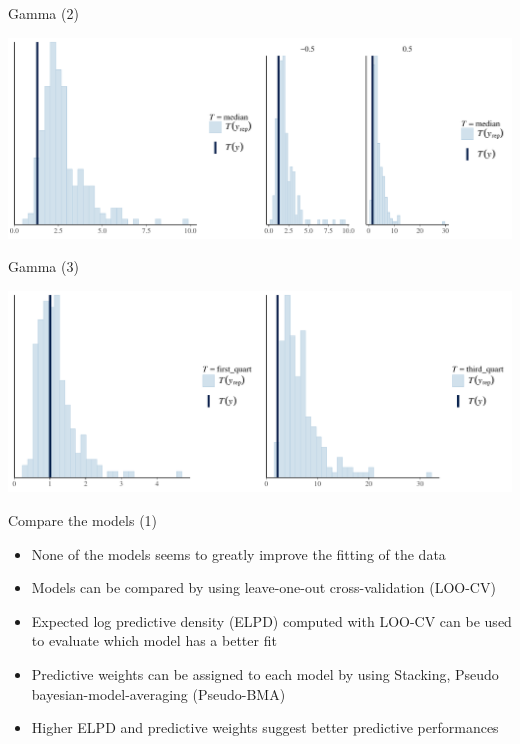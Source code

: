 \documentclass[ignorenonframetext,a4paper]{beamer}
\begin{document}
\begin{frame}{Gamma (2)}

\includegraphics{DB_presentation_case_study_files/figure-beamer/unnamed-chunk-19-1.pdf}

\end{frame}

\begin{frame}{Gamma (3)}

\includegraphics{DB_presentation_case_study_files/figure-beamer/unnamed-chunk-20-1.pdf}

\end{frame}

\begin{frame}{Compare the models (1)}

\begin{itemize}
\setlength\itemsep{1em}
  \item{None of the models seems to greatly improve the fitting of the
        data}
  \item{Models can be compared by using leave-one-out cross-validation
        (LOO-CV)}
  \item{Expected log predictive density (ELPD) computed with LOO-CV
        can be used to evaluate which model has a better fit}
  \item{Predictive weights can be assigned to each model by using
        Stacking, Pseudo bayesian-model-averaging (Pseudo-BMA)}
  \item{Higher ELPD and predictive weights suggest better 
        predictive performances}
\end{itemize}

\end{frame}
\end{document}
